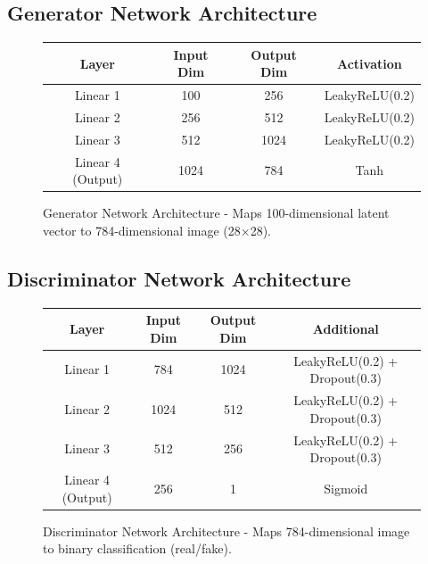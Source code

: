 \documentclass[12pt,a4paper]{article}
\begin{document}
\subsection{Generator Network Architecture}

\begin{figure}[H]
    \centering
    \begin{tabular}{|c|c|c|c|}
        \hline
        \textbf{Layer} & \textbf{Input Dim} & \textbf{Output Dim} & \textbf{Activation} \\
        \hline
        Linear 1 & 100 & 256 & LeakyReLU(0.2) \\
        \hline
        Linear 2 & 256 & 512 & LeakyReLU(0.2) \\
        \hline
        Linear 3 & 512 & 1024 & LeakyReLU(0.2) \\
        \hline
        Linear 4 (Output) & 1024 & 784 & Tanh \\
        \hline
    \end{tabular}
    \caption{Generator Network Architecture - Maps 100-dimensional latent vector to 784-dimensional image (28×28).}
    \label{fig:generator_arch}
\end{figure}

\subsection{Discriminator Network Architecture}

\begin{figure}[H]
    \centering
    \begin{tabular}{|c|c|c|c|}
        \hline
        \textbf{Layer} & \textbf{Input Dim} & \textbf{Output Dim} & \textbf{Additional} \\
        \hline
        Linear 1 & 784 & 1024 & LeakyReLU(0.2) + Dropout(0.3) \\
        \hline
        Linear 2 & 1024 & 512 & LeakyReLU(0.2) + Dropout(0.3) \\
        \hline
        Linear 3 & 512 & 256 & LeakyReLU(0.2) + Dropout(0.3) \\
        \hline
        Linear 4 (Output) & 256 & 1 & Sigmoid \\
        \hline
    \end{tabular}
    \caption{Discriminator Network Architecture - Maps 784-dimensional image to binary classification (real/fake).}
    \label{fig:discriminator_arch}
\end{figure}

\end{document}
